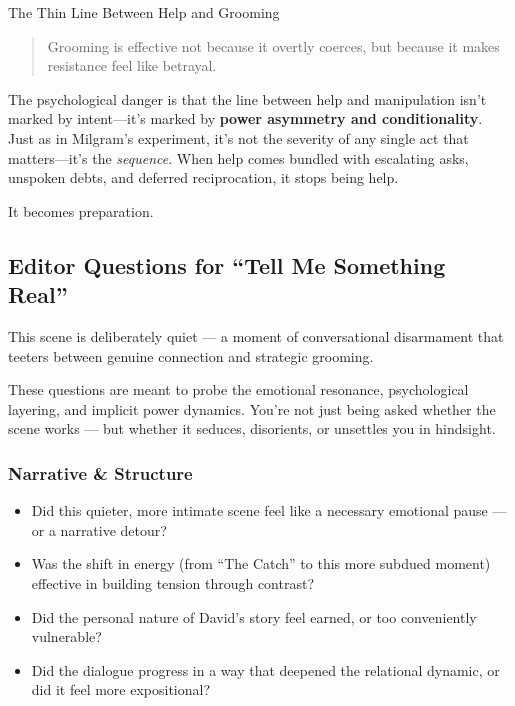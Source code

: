 \begin{PsychologicalSidebar}{The Thin Line Between Help and Grooming}
    \begin{quote}
      Grooming is effective not because it overtly coerces, but because it makes resistance feel like betrayal.
    \end{quote}
  
    The psychological danger is that the line between help and manipulation isn’t marked by intent—it’s marked by 
    \textbf{power asymmetry and conditionality}. Just as in Milgram’s experiment, it’s not the severity of any single 
    act that matters—it’s the \textit{sequence}. When help comes bundled with escalating asks, unspoken debts, 
    and deferred reciprocation, it stops being help.
  
    It becomes preparation.
  
  \end{PsychologicalSidebar}
  

\medskip

\subsection*{Editor Questions for ``Tell Me Something Real''}

This scene is deliberately quiet — a moment of conversational disarmament that teeters between genuine connection and 
strategic grooming.

These questions are meant to probe the emotional resonance, psychological layering, and implicit power dynamics.
You're not just being asked whether the scene works — but whether it seduces, disorients, or unsettles you in hindsight.

\subsubsection{Narrative \& Structure}

\begin{itemize}
\item Did this quieter, more intimate scene feel like a necessary emotional pause — or a narrative detour?
\item Was the shift in energy (from “The Catch” to this more subdued moment) effective in building tension through contrast?
\item Did the personal nature of David’s story feel earned, or too conveniently vulnerable?
\item Did the dialogue progress in a way that deepened the relational dynamic, or did it feel more expositional?
\end{itemize}

